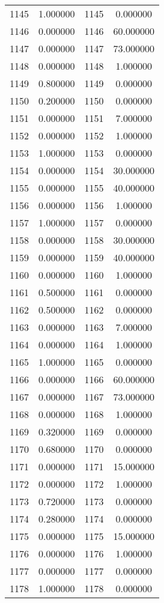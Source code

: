 \documentclass[12pt]{article}
\begin{document}
\begin{longtable}{@{}cccc@{}}
1145 & 1.000000 & 1145 & 0.000000 \\
1146 & 0.000000 & 1146 & 60.000000 \\
1147 & 0.000000 & 1147 & 73.000000 \\
1148 & 0.000000 & 1148 & 1.000000 \\
1149 & 0.800000 & 1149 & 0.000000 \\
1150 & 0.200000 & 1150 & 0.000000 \\
1151 & 0.000000 & 1151 & 7.000000 \\
1152 & 0.000000 & 1152 & 1.000000 \\
1153 & 1.000000 & 1153 & 0.000000 \\
1154 & 0.000000 & 1154 & 30.000000 \\
1155 & 0.000000 & 1155 & 40.000000 \\
1156 & 0.000000 & 1156 & 1.000000 \\
1157 & 1.000000 & 1157 & 0.000000 \\
1158 & 0.000000 & 1158 & 30.000000 \\
1159 & 0.000000 & 1159 & 40.000000 \\
1160 & 0.000000 & 1160 & 1.000000 \\
1161 & 0.500000 & 1161 & 0.000000 \\
1162 & 0.500000 & 1162 & 0.000000 \\
1163 & 0.000000 & 1163 & 7.000000 \\
1164 & 0.000000 & 1164 & 1.000000 \\
1165 & 1.000000 & 1165 & 0.000000 \\
1166 & 0.000000 & 1166 & 60.000000 \\
1167 & 0.000000 & 1167 & 73.000000 \\
1168 & 0.000000 & 1168 & 1.000000 \\
1169 & 0.320000 & 1169 & 0.000000 \\
1170 & 0.680000 & 1170 & 0.000000 \\
1171 & 0.000000 & 1171 & 15.000000 \\
1172 & 0.000000 & 1172 & 1.000000 \\
1173 & 0.720000 & 1173 & 0.000000 \\
1174 & 0.280000 & 1174 & 0.000000 \\
1175 & 0.000000 & 1175 & 15.000000 \\
1176 & 0.000000 & 1176 & 1.000000 \\
1177 & 0.000000 & 1177 & 0.000000 \\
1178 & 1.000000 & 1178 & 0.000000 \\

\end{longtable}
\end{document}
